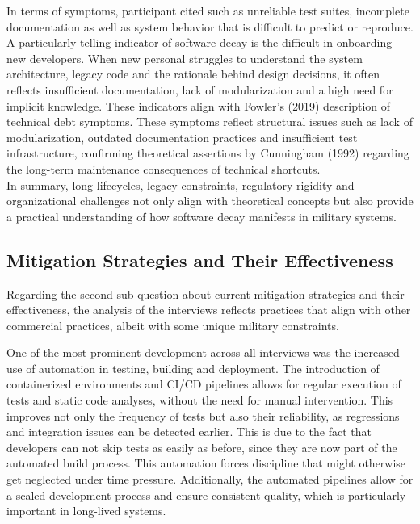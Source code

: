 In terms of symptoms, participant cited such as unreliable test suites, incomplete documentation as well as system behavior that is difficult to predict or reproduce. A particularly telling indicator of software decay is the difficult in onboarding new developers. When new personal struggles to understand
the system architecture, legacy code and the rationale behind design decisions, it often reflects insufficient documentation, lack of modularization and a high need for implicit knowledge. These indicators align with Fowler's (2019) description of technical debt symptoms.
These symptoms reflect structural issues such as lack of modularization, outdated documentation practices and insufficient test infrastructure, confirming theoretical assertions by Cunningham (1992) regarding the long-term maintenance consequences of technical shortcuts.\\

In summary, long lifecycles, legacy constraints, regulatory rigidity and organizational challenges not only align with theoretical concepts but also provide a practical understanding of how software decay manifests in military systems.

\subsection{Mitigation Strategies and Their Effectiveness}
Regarding the second sub-question about current mitigation strategies and their effectiveness, the analysis of the interviews reflects practices that align with other commercial practices, albeit with some unique military constraints.

One of the most prominent development across all interviews was the increased use of automation in testing, building and deployment. The introduction of containerized environments and CI/CD pipelines allows for regular execution of tests and static code analyses, without the need for manual intervention.
This improves not only the frequency of tests but also their reliability, as regressions and integration issues can be detected earlier. This is due to the fact that developers can not skip tests as easily as before, since they are now part of the automated build process.
This automation forces discipline that might otherwise get neglected under time pressure. Additionally, the automated pipelines allow for a scaled development process and ensure consistent quality, which is particularly important in long-lived systems.\\

